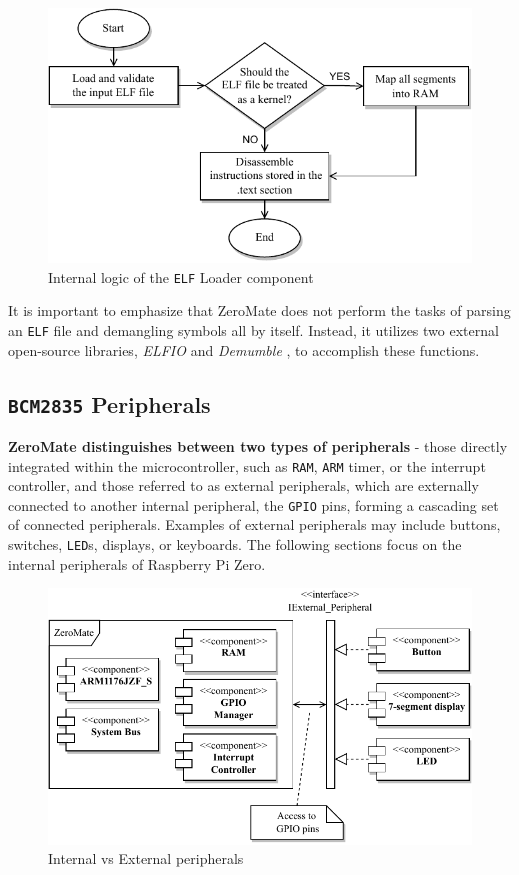 \documentclass[english, ing, kiv, he, iso690numb, pdf]{fasthesis}
\begin{document}
	\newpage
	
	\begin{figure}[ht]
		\centering
		\includegraphics[width=.9\textwidth]{img/diagrams/elf_diagram.pdf}
		\caption{Internal logic of the \texttt{ELF} Loader component}
		\label{Internal logic of the ELF Loader component}
	\end{figure}
	
	It is important to emphasize that ZeroMate does not perform the tasks of parsing an \texttt{ELF} file and demangling symbols all by itself. Instead, it utilizes two external open-source libraries, \textit{ELFIO} \cite{elifio} and \textit{Demumble} \cite{demumble}, to accomplish these functions.
	
	\subsection{\texttt{BCM2835} Peripherals} \label{Peripherals}
	
	\textbf{ZeroMate distinguishes between two types of peripherals} - those directly integrated within the microcontroller, such as \texttt{RAM}, \texttt{ARM} timer, or the interrupt controller, and those referred to as external peripherals, which are externally connected to another internal peripheral, the \texttt{GPIO} pins, forming a cascading set of connected peripherals. Examples of external peripherals may include buttons, switches, \texttt{LED}s, displays, or keyboards. The following sections focus on the internal peripherals of Raspberry Pi Zero.
	
	\newpage
	
	\begin{figure}[ht]
		\centering
		\includegraphics[width=.9\textwidth]{img/diagrams/peripherals.pdf}
		\caption{Internal vs External peripherals}
		\label{Internal vs External peripherals}
	\end{figure}
	
\end{document}
